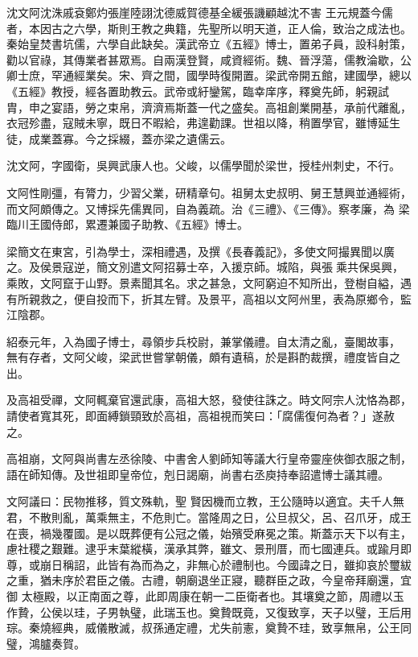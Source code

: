 
\begin{pinyinscope}

 沈文阿沈洙戚袞鄭灼張崖陸詡沈德威賀德基全緩張譏顧越沈不害
 王元規蓋今儒者，本因古之六學，斯則王教之典籍，先聖所以明天道，正人倫，致治之成法也。秦始皇焚書坑儒，六學自此缺矣。漢武帝立《五經》博士，置弟子員，設科射策，勸以官祿，其傳業者甚眾焉。自兩漢登賢，咸資經術。魏、晉浮蕩，儒教淪歇，公卿士庶，罕通經業矣。宋、齊之間，國學時復開置。梁武帝開五館，建國學，總以《五經》教授，經各置助教云。武帝或紆鑾駕，臨幸庠序，釋奠先師，躬親試
 胄，申之宴語，勞之束帛，濟濟焉斯蓋一代之盛矣。高祖創業開基，承前代離亂，衣冠殄盡，寇賊未寧，既日不暇給，弗遑勸課。世祖以降，稍置學官，雖博延生徒，成業蓋寡。今之採綴，蓋亦梁之遺儒云。



 沈文阿，字國衛，吳興武康人也。父峻，以儒學聞於梁世，授桂州刺史，不行。



 文阿性剛彊，有膂力，少習父業，研精章句。祖舅太史叔明、舅王慧興並通經術，而文阿頗傳之。又博採先儒異同，自為義疏。治《三禮》、《三傳》。察孝廉，為
 梁臨川王國侍郎，累遷兼國子助教、《五經》博士。



 梁簡文在東宮，引為學士，深相禮遇，及撰《長春義記》，多使文阿撮異聞以廣之。及侯景寇逆，簡文別遣文阿招募士卒，入援京師。城陷，與張乘共保吳興，乘敗，文阿竄于山野。景素聞其名。求之甚急，文阿窮迫不知所出，登樹自縊，遇有所親救之，便自投而下，折其左臂。及景平，高祖以文阿州里，表為原鄉令，監江陰郡。



 紹泰元年，入為國子博士，尋領步兵校尉，兼掌儀禮。自太清之亂，臺閣故事，
 無有存者，文阿父峻，梁武世嘗掌朝儀，頗有遺稿，於是斟酌裁撰，禮度皆自之出。



 及高祖受禪，文阿輒棄官還武康，高祖大怒，發使往誅之。時文阿宗人沈恪為郡，請使者寬其死，即面縛鎖頸致於高祖，高祖視而笑曰：「腐儒復何為者？」遂赦之。



 高祖崩，文阿與尚書左丞徐陵、中書舍人劉師知等議大行皇帝靈座俠御衣服之制，語在師知傳。及世祖即皇帝位，剋日謁廟，尚書右丞庾持奉詔遣博士議其禮。



 文阿議曰：民物推移，質文殊軌，聖
 賢因機而立教，王公隨時以適宜。夫千人無君，不散則亂，萬乘無主，不危則亡。當隆周之日，公旦叔父，呂、召爪牙，成王在喪，禍幾覆國。是以既葬便有公冠之儀，始殯受麻冕之策。斯蓋示天下以有主，慮社稷之艱難。逮乎末葉縱橫，漢承其弊，雖文、景刑厝，而七國連兵。或踰月即尊，或崩日稱詔，此皆有為而為之，非無心於禮制也。今國諱之日，雖抑哀於璽紱之重，猶未序於君臣之儀。古禮，朝廟退坐正寢，聽群臣之政，今皇帝拜廟還，宜御
 太極殿，以正南面之尊，此即周康在朝一二臣衛者也。其壤奠之節，周禮以玉作贄，公侯以珪，子男執璧，此瑞玉也。奠贄既竟，又復致享，天子以璧，王后用琮。秦燒經典，威儀散滅，叔孫通定禮，尤失前憲，奠贄不珪，致享無帛，公王同璧，鴻臚奏賀。




\end{pinyinscope}

